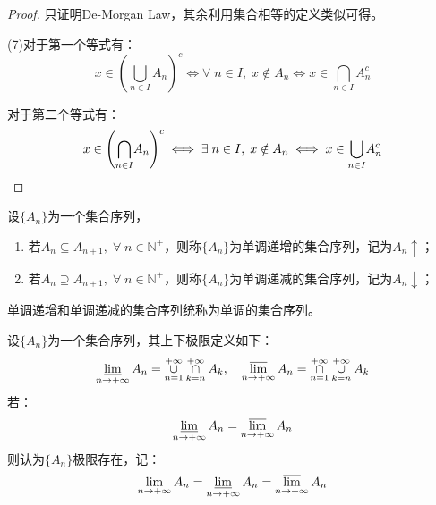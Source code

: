 \begin{proof}
	只证明De-Morgan Law，其余利用集合相等的定义类似可得。\par
	(7)对于第一个等式有：
	\begin{equation*}
		x\in\left(\underset{n\in I}{\bigcup}A_n\right)^c
		\iff
		\forall\;n\in I,\;x\notin A_n
		\iff
		x\in\underset{n\in I}{\bigcap}A_n^c
	\end{equation*}\par
	对于第二个等式有：
	\begin{equation*}
		x\in\left(\underset{n\in I}{\bigcap}A_n\right)^c
		\iff
		\exists\;n\in I,\;x\notin A_n
		\iff
		x\in\underset{n\in I}{\bigcup}A_n^c\qedhere
	\end{equation*}
\end{proof}
\begin{definition}
	设$\{A_n\}$为一个集合序列，
	\begin{enumerate}
		\item 若$A_n\subseteq A_{n+1},\;\forall\;n\in\mathbb{N}^+$，则称$\{A_n\}$为单调递增的集合序列，记为$A_n\uparrow$；
		\item 若$A_n\supseteq A_{n+1},\;\forall\;n\in\mathbb{N}^+$，则称$\{A_n\}$为单调递减的集合序列，记为$A_n\downarrow$；
	\end{enumerate}
	单调递增和单调递减的集合序列统称为单调的集合序列。
\end{definition}
\begin{definition}
	设$\{A_n\}$为一个集合序列，其上下极限定义如下：
	\begin{equation*}
		\varliminf_{n\to+\infty}A_n=\underset{n=1}{\overset{+\infty}{\cup}}\underset{k=n}{\overset{+\infty}{\cap}}A_k,\quad
		\varlimsup_{n\to+\infty}A_n=\underset{n=1}{\overset{+\infty}{\cap}}\underset{k=n}{\overset{+\infty}{\cup}}A_k
	\end{equation*}
	若：
	\begin{equation*}
		\varliminf_{n\to+\infty}A_n=\varlimsup_{n\to+\infty}A_n
	\end{equation*}
	则认为$\{A_n\}$极限存在，记：
	\begin{equation*}
		\lim_{n\to+\infty}A_n=\varliminf_{n\to+\infty}A_n=\varlimsup_{n\to+\infty}A_n
	\end{equation*}
\end{definition}
